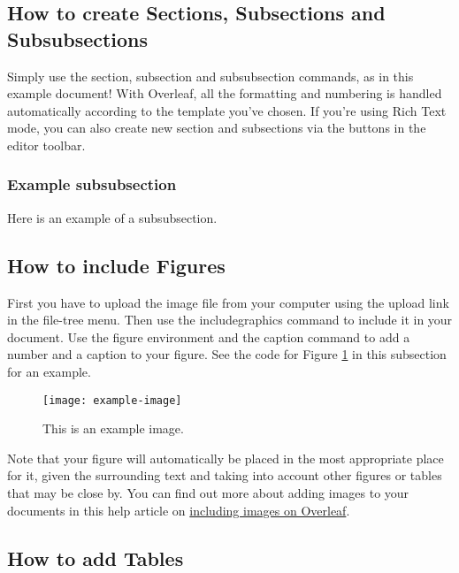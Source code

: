 \documentclass[12pt,a4paper,faculty=eb,language=en]{ugent-doc}
\begin{document}
\subsection{How to create Sections, Subsections and Subsubsections}

Simply use the section, subsection and subsubsection commands, as in this example document! With Overleaf, all the formatting and numbering is handled automatically according to the template you've chosen. If you're using Rich Text mode, you can also create new section and subsections via the buttons in the editor toolbar.

\subsubsection{Example subsubsection}

Here is an example of a subsubsection.


\subsection{How to include Figures}

First you have to upload the image file from your computer using the upload link in the file-tree menu. Then use the includegraphics command to include it in your document. Use the figure environment and the caption command to add a number and a caption to your figure. See the code for Figure \ref{fig:exampleimage} in this subsection for an example.

\begin{figure}[h]
    \centering
    \texttt{[image: example-image]}
    \caption{\label{fig:exampleimage}This is an example image.}
\end{figure}

Note that your figure will automatically be placed in the most appropriate place for it, given the surrounding text and taking into account other figures or tables that may be close by. You can find out more about adding images to your documents in this help article on \href{https://www.overleaf.com/learn/how-to/Including_images_on_Overleaf}{including images on Overleaf}.


\subsection{How to add Tables}
\end{document}
